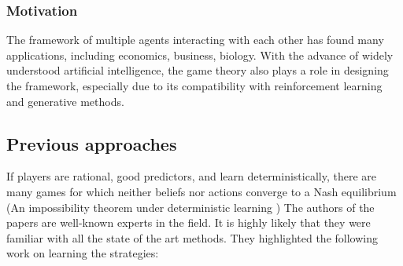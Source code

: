 \documentclass[]{spie}  %
\begin{document}
\subsubsection{Motivation}
\label{sec:motivation}
The framework of multiple agents interacting with each other has found many applications, including economics, business, biology. With the advance of widely understood artificial intelligence, the game theory also plays a role in designing the framework, especially due to its compatibility with reinforcement learning \cite{nowe2012game} and generative methods. \cite{goodfellow2014generative} \cite{zhou2019survey} \cite{yasodharan2019nonzero}

\subsection{Previous approaches}
\label{sec:previous}
If players are rational, good predictors, and learn deterministically, there are many games for which neither beliefs nor actions converge to a Nash equilibrium (An impossibility theorem under deterministic learning \cite{foster1998learning})
The authors of the papers are well-known experts in the field. It is highly likely that they were familiar with all the state of the art methods. They highlighted the following work on learning the strategies:
\end{document}
